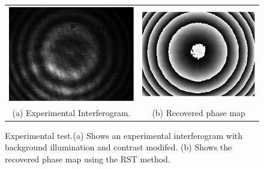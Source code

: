 \documentclass[letterpaper,12pt]{article}   %
\begin{document}
\begin{figure}[h t]
	\begin{center}
		\begin{tabular}{c c}
			\includegraphics[scale=0.35]{figures/InterferogramaExpMod.png}}&
			\includegraphics[scale=0.35]{figures/faseExpRST.png}}& \\
			(a) Experimental Interferogram. & (b) Recovered phase map
		\end{tabular}
	\end{center}
	\caption{Experimental test.(a) Shows an experimental interferogram with background 
	illumination and contrast modifed. (b) Shows the recovered phase map using the RST 
	method.}
	\label{fig:ExpPhase}
\end{figure}
\end{document}
